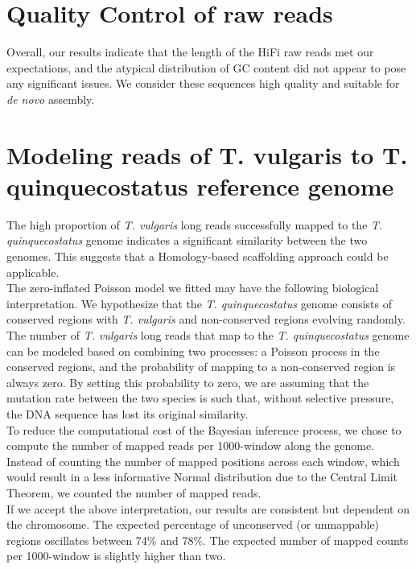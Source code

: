\section*{Quality Control of raw reads}

Overall, our results indicate that the length of the \ac{HiFi} raw reads met our expectations, and the atypical distribution of GC content did not appear to pose any significant issues. We consider these sequences high quality and suitable for \textit{de novo} assembly. 

\section*{Modeling reads of T. vulgaris to T. quinquecostatus reference genome}


The high proportion of \textit{T. vulgaris} long reads successfully mapped to the \textit{T. quinquecostatus} genome indicates a significant similarity between the two genomes. This suggests that a Homology-based scaffolding approach could be applicable.\\


The zero-inflated Poisson model we fitted may have the following biological interpretation. We hypothesize that the \textit{T. quinquecostatus} genome consists of conserved regions with \textit{T. vulgaris} and non-conserved regions evolving randomly. The number of \textit{T. vulgaris} long reads that map to the \textit{T. quinquecostatus} genome can be modeled based on combining two processes: a Poisson process in the conserved regions, and the probability of mapping to a non-conserved region is always zero. By setting this probability to zero, we are assuming that the mutation rate between the two species is such that, without selective pressure, the DNA sequence has lost its original similarity. \\

To reduce the computational cost of the Bayesian inference process, we chose to compute the number of mapped reads per 1000-window along the genome. Instead of counting the number of mapped positions across each window, which would result in a less informative Normal distribution due to the Central Limit Theorem, we counted the number of mapped reads.\\

If we accept the above interpretation,  our results are consistent but dependent on the chromosome. The expected percentage of unconserved (or unmappable) regions oscillates between 74\% and 78\%. The expected number of mapped counts per 1000-window is slightly higher than two.\\

